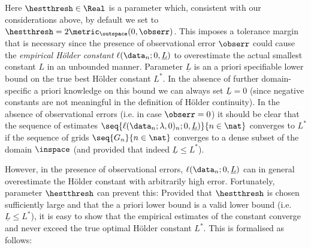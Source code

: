  Here $\hestthresh \in \Real$ is a parameter which, consistent with our considerations above, by default we set to $\hestthresh = 2 \metric_\outspace(0, \obserr)$. This imposes a tolerance margin that is necessary since the presence of observational error $\obserr$ could cause the \emph{empirical H\"older constant} $\ell(\data_n;0,\underline L)$ to overestimate the actual smallest constant $L$ in an unbounded manner. 
Parameter $\underline L$ is an a priori specifiable lower bound on the true best H\"older constant $L^*$. In the absence of further domain-specific a priori knowledge on this bound we can always set $\underline L=0$ (since negative constants are not meaningful in the definition of H\"older continuity). 
In the absence of observational errors (i.e. in case $\obserr =0$) it should be clear that the sequence of estimates $\seq{\ell(\data_n;\lambda,0)_n;0,\underline L)}{n \in \nat}$ converges to $L^*$ if the sequence of grids $\seq{G_n}{n \in \nat}$ converges to a dense subset of the domain $\inspace$ (and provided that indeed $\underline L \leq L^*$).

However, in the presence of observational errors, $\ell(\data_n;0,\underline L)$ can in general overestimate the H\"older constant with arbitrarily high error. Fortunately, parameter $\hestthresh$ can prevent this:
Provided that $\hestthresh$ is chosen sufficiently large and that the a priori lower bound is a valid lower bound (i.e. $\underline L \leq L^*$), it is easy to show that the empirical estimates of the constant converge and never exceed the true optimal H\"older constant $L^*$. 
This is formalised as follows:

